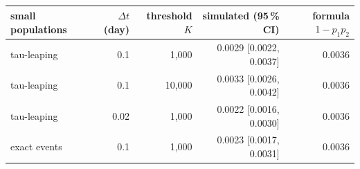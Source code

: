 \begin{tabular}{lrrrr}
\toprule
small populations & $\Delta t$ (day) & threshold $K$ & simulated (95\,\% CI) & formula $1-p_1p_2$ \\
\midrule
tau-leaping & 0.1 & 1{,}000 & 0.0029 [0.0022, 0.0037] & 0.0036 \\
tau-leaping & 0.1 & 10{,}000 & 0.0033 [0.0026, 0.0042] & 0.0036 \\
tau-leaping & 0.02 & 1{,}000 & 0.0022 [0.0016, 0.0030] & 0.0036 \\
exact events & 0.1 & 1{,}000 & 0.0023 [0.0017, 0.0031] & 0.0036 \\
\bottomrule
\end{tabular}
